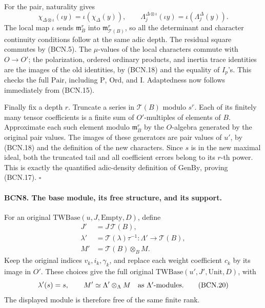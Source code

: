 For the pair, naturality gives
\[
 \chi_{\Delta\otimes\iota}(\iota y)
      =\iota(\chi_\Delta(y)),\qquad
 \Lambda_j^{\Delta\otimes\iota}(\iota y)
      =\iota(\Lambda_j^\Delta(y)).                              \tag{BCN.18}
\]
The local map \(\iota\) sends \(\mathfrak m_B^r\) into
\(\mathfrak m_{\mathscr T(B)}^r\), so all the determinant and
character continuity conditions follow at the same adic
depth.  The residual square commutes by (BCN.5).
The \(\mu\)-values of the local characters commute with
\(O\to O'\); the polarization, ordered ordinary products,
and inertia trace identities are the images of the old
identities, by (BCN.18) and the equality of \(I_p\)'s.
This checks the full \(\mathrm{Pair}\), including
\(\mathrm{P}\), \(\mathrm{Ord}\), and \(\mathrm{I}\).
Adaptedness now follows immediately from (BCN.15).

Finally fix a depth \(r\).  Truncate a series in
\(\mathscr T(B)\) modulo \(s^r\).  Each of its finitely many
tensor coefficients is a finite sum of \(O'\)-multiples of
elements of \(B\).  Approximate each such element modulo
\(\mathfrak m_B^r\) by the \(O\)-algebra generated by the
original pair values.  The images of these generators are
pair values of \(u'\), by (BCN.18) and the definition of
the new characters.  Since \(s\) is in the new maximal
ideal, both the truncated tail and all coefficient errors
belong to its \(r\)-th power.  This is exactly the quantified
adic-density definition of \(\mathrm{GenBy}\), proving
(BCN.17).
\hfill\(\square\)

\paragraph{BCN8. The base module, its free structure, and its support.}\label{claim:BCN8}
For an original \(\mathrm{TWBase}(u,J,\mathrm{Empty},D)\),
define
\[
 \begin{aligned}
 J'&=J\,\mathscr T(B),\\
 \lambda'&=\mathscr T(\lambda)\tau^{-1}:\Lambda'\to\mathscr T(B),\\
 M'&=\mathscr T(B)\otimes_B M .
 \end{aligned}                                                   \tag{BCN.19}
\]
Keep the original indices \(v_k,i_k,\gamma_k\), and replace each
weight coefficient \(c_k\) by its image in \(O'\).
These choices give the full original
\(\mathrm{TWBase}(u',J',\mathrm{Unit},D)\), with
\[
 \lambda'(s)=s,\qquad
 M'\simeq\Lambda'\otimes_\Lambda M
 \quad\hbox{as \(\Lambda'\)-modules}.                           \tag{BCN.20}
\]
The displayed module is therefore free of the same finite rank.

